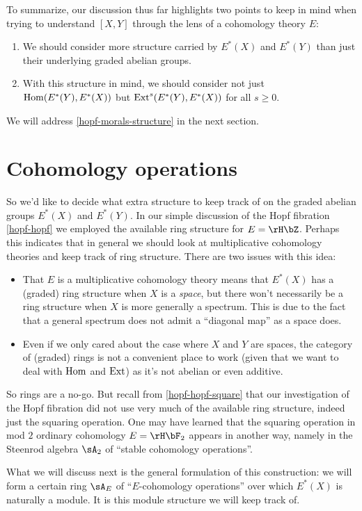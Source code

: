 \begin{nothing}
  \label{hopf-morals}
  To summarize, our discussion thus far highlights two points to keep in mind when trying to understand $[X,Y]$ through the lens of a cohomology theory $E$:
  \begin{enumerate}
  \item \label{hopf-morals-structure}
    We should consider more structure carried by $E^*(X)$ and $E^*(Y)$ than just their underlying graded abelian groups.
  \item \label{hopf-morals-ext}
    With this structure in mind, we should consider not just $\operatorname{Hom}(E^*(Y),E^*(X))$ but $\operatorname{Ext}^s(E^*(Y),E^*(X))$ for all $s \ge 0$.
  \end{enumerate}
  We will address \cref{hopf-morals-structure} in the next section.
\end{nothing}


\section{Cohomology operations}
\label{ops}

\begin{nothing}
  \label{ops-ring-problems}
  So we'd like to decide what extra structure to keep track of on the graded abelian groups $E^*(X)$ and $E^*(Y)$. In our simple discussion of the Hopf fibration \cref{hopf-hopf} we employed the available ring structure for $E = \rH\bZ$. Perhaps this indicates that in general we should look at multiplicative cohomology theories and keep track of ring structure. There are two issues with this idea:
  \begin{itemize}
  \item That $E$ is a multiplicative cohomology theory means that $E^*(X)$ has a (graded) ring structure when $X$ is a \emph{space}, but there won't necessarily be a ring structure when $X$ is more generally a spectrum. This is due to the fact that a general spectrum does not admit a ``diagonal map'' as a space does.
  \item Even if we only cared about the case where $X$ and $Y$ are spaces, the category of (graded) rings is not a convenient place to work (given that we want to deal with $\operatorname{Hom}$ and $\operatorname{Ext}$) as it's not abelian or even additive.
  \end{itemize}

  So rings are a no-go. But recall from \cref{hopf-hopf-square} that our investigation of the Hopf fibration did not use very much of the available ring structure, indeed just the squaring operation. One may have learned that the squaring operation in mod $2$ ordinary cohomology $E = \rH\bF_2$ appears in another way, namely in the Steenrod algebra $\sA_2$ of ``stable cohomology operations''.

  What we will discuss next is the general formulation of this construction: we will form a certain ring $\sA_E$ of ``$E$-cohomology operations'' over which $E^*(X)$ is naturally a module. It is this module structure we will keep track of.
\end{nothing}

